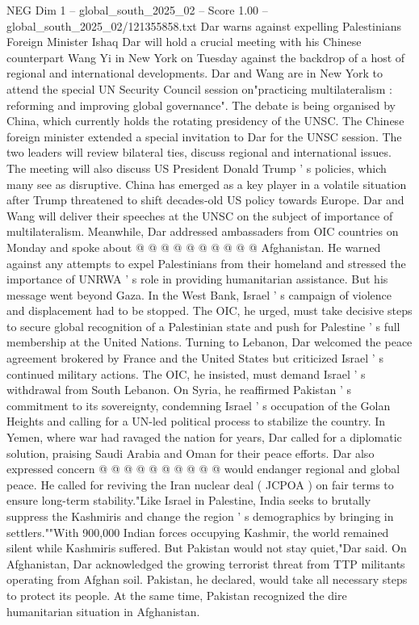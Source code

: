 \begin{textsample}{NEG Dim 1 – global\_south\_2025\_02 – Score 1.00 – global\_south\_2025\_02/121355858.txt}  \label{ex:f1_neg_029}
Dar warns against expelling Palestinians Foreign Minister Ishaq Dar will hold a crucial meeting with his Chinese counterpart Wang Yi in New York on Tuesday against the backdrop of a host of regional and international developments.
Dar and Wang are in New York to attend the special UN Security Council session on"practicing multilateralism : reforming and improving global governance".
The debate is being organised by China, which currently holds the rotating presidency of the UNSC.
The Chinese foreign minister extended a special invitation to Dar for the UNSC session.
The two leaders will review bilateral ties, discuss regional and international issues.
The meeting will also discuss US President Donald Trump ' s policies, which many see as disruptive.
China has emerged as a key player in a volatile situation after Trump threatened to shift decades-old US policy towards Europe.
Dar and Wang will deliver their speeches at the UNSC on the subject of importance of multilateralism.
Meanwhile, Dar addressed ambassaders from OIC countries on Monday and spoke about @ @ @ @ @ @ @ @ @ @ Afghanistan.
He warned against any attempts to expel Palestinians from their homeland and stressed the importance of UNRWA ' s role in providing humanitarian assistance.
But his message went beyond Gaza.
In the West Bank, Israel ' s campaign of violence and displacement had to be stopped.
The OIC, he urged, must take decisive steps to secure global recognition of a Palestinian state and push for Palestine ' s full membership at the United Nations.
Turning to Lebanon, Dar welcomed the peace agreement brokered by France and the United States but criticized Israel ' s continued military actions.
The OIC, he insisted, must demand Israel ' s withdrawal from South Lebanon.
On Syria, he reaffirmed Pakistan ' s commitment to its sovereignty, condemning Israel ' s occupation of the Golan Heights and calling for a UN-led political process to stabilize the country.
In Yemen, where war had ravaged the nation for years, Dar called for a diplomatic solution, praising Saudi Arabia and Oman for their peace efforts.
Dar also expressed concern @ @ @ @ @ @ @ @ @ @ would endanger regional and global peace.
He called for reviving the Iran nuclear deal ( JCPOA ) on fair terms to ensure long-term stability."Like Israel in Palestine, India seeks to brutally suppress the Kashmiris and change the region ' s demographics by bringing in settlers.""With 900,000 Indian forces occupying Kashmir, the world remained silent while Kashmiris suffered.
But Pakistan would not stay quiet,"Dar said.
On Afghanistan, Dar acknowledged the growing terrorist threat from TTP militants operating from Afghan soil.
Pakistan, he declared, would take all necessary steps to protect its people.
At the same time, Pakistan recognized the dire humanitarian situation in Afghanistan.

\end{textsample}
